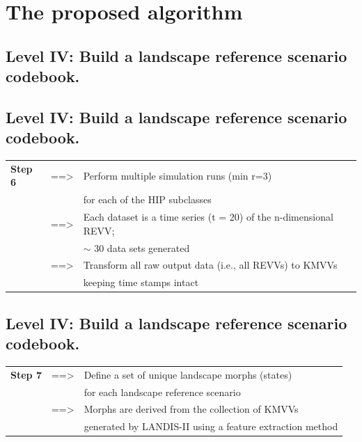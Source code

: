 \documentclass[
paper=128mm:96mm, %
fontsize=11pt, %
pagesize, %
parskip=half-, %
]{scrartcl} %
\theoremstyle{mythmstyle} %
\begin{document}
\clearpage
\section{The proposed algorithm}
\subsection{Level IV: Build a landscape reference scenario codebook.}
    
\clearpage
\subsection{Level IV: Build a landscape reference scenario codebook.}
\footnotesize 
\begin{tabular}{lll}
	\textbf{Step 6} & ==> & Perform multiple simulation runs (min r=3) \\
	& & for each of the HIP subclasses\\
	& ==> & Each dataset is a time series (t = 20) of the n-dimensional REVV; \\
	& & $\sim$ 30 data sets generated\\
	& ==> & Transform all raw output data (i.e., all REVVs) to KMVVs\\
	& & keeping time stamps intact
\end{tabular}

\clearpage
\subsection{Level IV: Build a landscape reference scenario codebook.}
\footnotesize 
\begin{tabular}{lll}
	\textbf{Step 7} & ==> & Define a set of unique landscape morphs (states)\\
	& & for each landscape reference scenario\\
	& ==> & Morphs are derived from the collection of KMVVs\\
	& & generated by LANDIS-II using a feature extraction method
\end{tabular}
\end{document}
